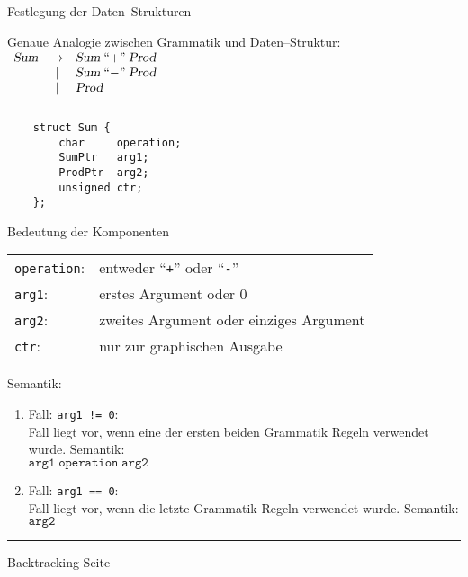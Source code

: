 \begin{slide}{}
\normalsize

\begin{center}
Festlegung der Daten--Strukturen
\end{center}
\vspace*{0.5cm}

\footnotesize
Genaue Analogie zwischen Grammatik und Daten--Struktur: \\[0.3cm]
\hspace*{1.3cm} 
$\begin{array}{lcl}
         \textsl{Sum}  & \rightarrow & \textsl{Sum}\; ``\mathtt{+}\cq \; \textsl{Prod}    \\
                       & |           & \textsl{Sum}\; ``\mathtt{-}\cq \; \textsl{Prod}    \\
                       & |           & \textsl{Prod}                                      \\[0.3cm]
      \end{array}
      $    

\begin{verbatim}
    struct Sum {
        char     operation; 
        SumPtr   arg1;
        ProdPtr  arg2;
        unsigned ctr;  
    };
\end{verbatim}

Bedeutung der Komponenten \\[0.3cm]
\hspace*{0.3cm} 
\begin{tabular}{ll}
 \texttt{operation}: & entweder ``\texttt{+}'' oder ``\texttt{-}'' \\[0.3cm]
 \texttt{arg1}:      & erstes Argument oder 0                      \\[0.3cm]
 \texttt{arg2}:      & zweites Argument oder einziges Argument     \\[0.3cm]
 \texttt{ctr}:       & nur zur graphischen Ausgabe 
\end{tabular}

Semantik: 
\begin{enumerate}
\item Fall: \texttt{arg1 != 0}: \\[0.3cm]
      Fall liegt vor, wenn eine der ersten beiden Grammatik Regeln verwendet wurde.
      Semantik: \\[0.3cm]
      \hspace*{1.3cm}  $\mathtt{arg1} \; \mathtt{operation} \; \mathtt{arg2}$
\item Fall: \texttt{arg1 == 0}: \\[0.3cm]
      Fall liegt vor, wenn die letzte Grammatik Regeln verwendet wurde.
      Semantik: \\[0.3cm]
      \hspace*{1.3cm}  $\mathtt{arg2}$
\end{enumerate}

\vspace*{\fill}
\tiny \addtocounter{mypage}{1}
\rule{17cm}{1mm}
Backtracking  \hspace*{\fill} Seite 
\end{slide}

